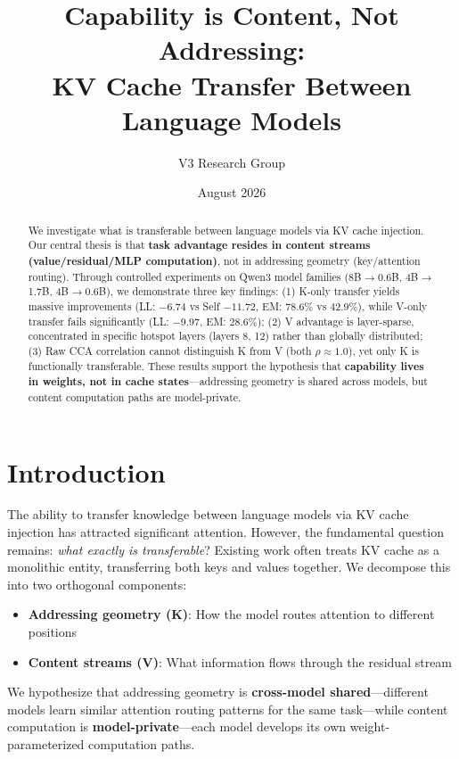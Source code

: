 \documentclass[11pt]{article}
\title{Capability is Content, Not Addressing: \\ KV Cache Transfer Between Language Models}
\author{V3 Research Group}
\date{August 2026}
\begin{document}
\maketitle

\begin{abstract}
We investigate what is transferable between language models via KV cache injection. 
Our central thesis is that \textbf{task advantage resides in content streams (value/residual/MLP computation)}, not in addressing geometry (key/attention routing).
Through controlled experiments on Qwen3 model families (8B$\to$0.6B, 4B$\to$1.7B, 4B$\to$0.6B), we demonstrate three key findings:
(1) K-only transfer yields massive improvements (LL: $-6.74$ vs Self $-11.72$, EM: $78.6\%$ vs $42.9\%$), while V-only transfer fails significantly (LL: $-9.97$, EM: $28.6\%$);
(2) V advantage is layer-sparse, concentrated in specific hotspot layers (layers 8, 12) rather than globally distributed;
(3) Raw CCA correlation cannot distinguish K from V (both $\rho \approx 1.0$), yet only K is functionally transferable.
These results support the hypothesis that \textbf{capability lives in weights, not in cache states}---addressing geometry is shared across models, but content computation paths are model-private.
\end{abstract}

\section{Introduction}

The ability to transfer knowledge between language models via KV cache injection has attracted significant attention.
However, the fundamental question remains: \emph{what exactly is transferable}?
Existing work often treats KV cache as a monolithic entity, transferring both keys and values together.
We decompose this into two orthogonal components:
\begin{itemize}
    \item \textbf{Addressing geometry (K)}: How the model routes attention to different positions
    \item \textbf{Content streams (V)}: What information flows through the residual stream
\end{itemize}

We hypothesize that addressing geometry is \textbf{cross-model shared}---different models learn similar attention routing patterns for the same task---while content computation is \textbf{model-private}---each model develops its own weight-parameterized computation paths.
\end{document}

